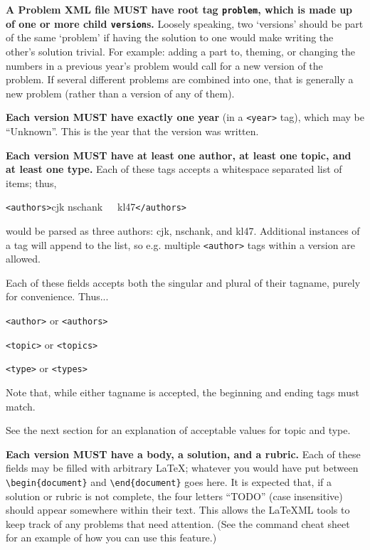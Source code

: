     \textbf{A Problem XML file MUST have root tag \texttt{problem}, which 
    is made up of one or more child \texttt{version}s.} Loosely speaking, 
    two `versions' should be part of the same `problem' if having the 
    solution to one would make writing the other's solution trivial. For 
    example: adding a part to, theming, or changing the numbers in a 
    previous year's problem would call for a new version of the problem. 
    If several different problems are combined into one, that is generally 
    a new problem (rather than a version of any of them).
    
    \textbf{Each version MUST have exactly one year} (in a \texttt{<year>} 
    tag), which may be ``Unknown''. This is the year that the version was 
    written.
    
    \textbf{Each version MUST have at least one author, at least one 
    topic, and at least one type.} Each of these tags accepts a whitespace 
    separated list of items; thus,
    \begin{center}
      \texttt{<authors>}cjk nschank\ \ \ kl47\texttt{</authors>}
    \end{center}
    would be parsed as three authors: cjk, nschank, and kl47. Additional 
    instances of a tag will append to the list, so e.g. multiple 
    \texttt{<author>} tags within a version are allowed.
    
    Each of these fields accepts both the singular and plural of their 
    tagname, purely for convenience. Thus...
    \begin{description}\itemsep0pt
      \item[Authors] \texttt{<author>} or \texttt{<authors>}
      \item[Topic] \texttt{<topic>} or \texttt{<topics>}
      \item[Type] \texttt{<type>} or \texttt{<types>}
    \end{description}
    
    Note that, while either tagname is accepted, the beginning and ending 
    tags must match.
    
    See the next section for an explanation of acceptable values for topic 
    and type.
    
    \textbf{Each version MUST have a body, a solution, and a rubric.} 
    Each of these fields may be filled with arbitrary \LaTeX; whatever you 
    would have put between \texttt{\textbackslash begin\{document\}} and 
    \texttt{\textbackslash end\{document\}} goes here. It is expected 
    that, if a solution or rubric is not complete, the four letters ``TODO'' 
    (case insensitive) should appear somewhere within their text. This 
    allows the \LaTeX ML tools to keep track of any problems that need 
    attention. (See the command cheat sheet for an example of how you can use
    this feature.)
    
